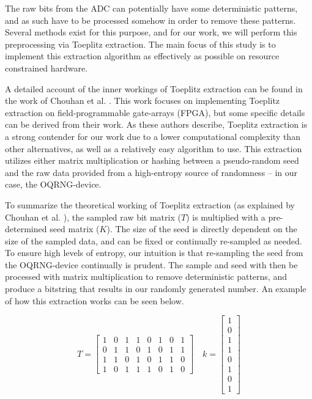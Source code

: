 The raw bits from the ADC can potentially have some deterministic patterns, and as such have to be processed somehow in order to remove these patterns. Several methods exist for this purpose, and for our work, we will perform this preprocessing via Toeplitz extraction. The main focus of this study is to implement this extraction algorithm as effectively as possible on resource constrained hardware.

A detailed account of the inner workings of Toeplitz extraction can be found in the work of Chouhan et al. \cite{toeplitz-desc}. This work focuses on implementing Toeplitz extraction on field-programmable gate-arrays (FPGA), but some specific details can be derived from their work. As these authors describe, Toeplitz extraction is a strong contender for our work due to a lower computational complexity than other alternatives, as well as a relatively easy algorithm to use. This extraction utilizes either matrix multiplication or hashing between a pseudo-random seed and the raw data provided from a high-entropy source of randomness -- in our case, the OQRNG-device.

To summarize the theoretical working of Toeplitz extraction (as explained by Chouhan et al. \cite{toeplitz-desc}), the sampled raw bit matrix (\(T\)) is multiplied with a pre-determined seed matrix (\(K\)). The size of the seed is directly dependent on the size of the sampled data, and can be fixed or continually re-sampled as needed. To ensure high levels of entropy, our intuition is that re-sampling the seed from the OQRNG-device continually is prudent. The sample and seed with then be processed with matrix multiplication to remove deterministic patterns, and produce a bitstring that results in our randomly generated number. An example of how this extraction works can be seen below.

\[
T =
\begin{bmatrix}
1 & 0 & 1 & 1 & 0 & 1 & 0 & 1 \\
0 & 1 & 1 & 0 & 1 & 0 & 1 & 1 \\
1 & 1 & 0 & 1 & 0 & 1 & 1 & 0 \\
1 & 0 & 1 & 1 & 1 & 0 & 1 & 0
\end{bmatrix}
\quad
k =
\begin{bmatrix}
1 \\ 0 \\ 1 \\ 1 \\ 0 \\ 1 \\ 0 \\ 1
\end{bmatrix}
\]

